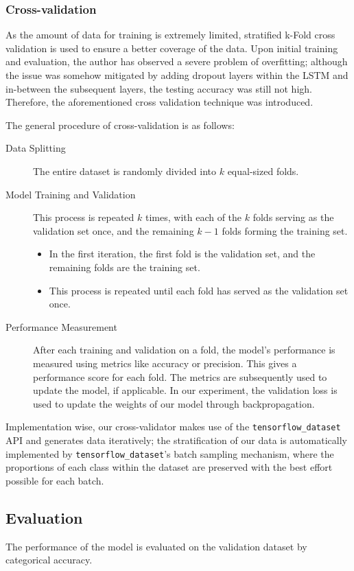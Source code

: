 \documentclass[letterpaper]{article} %
\begin{document}
\subsubsection{Cross-validation}
As the amount of data for training is extremely limited,
stratified k-Fold cross validation is used to ensure a better
coverage of the data. 
Upon initial training and evaluation, the author has observed 
a severe problem of overfitting; although the issue was somehow
mitigated by adding dropout layers within the LSTM and in-between
the subsequent layers, the testing accuracy was still not high.
Therefore, the aforementioned cross validation technique was introduced.

The general procedure of cross-validation is as follows:
\begin{description}
  \item[Data Splitting] 
  The entire dataset is randomly divided into $k$ equal-sized folds. 
  \item[Model Training and Validation] 
  This process is repeated $k$ times, with each of the $k$ folds 
  serving as the validation set once, 
  and the remaining $k - 1$ folds forming the training set.
  \begin{itemize}
      \item In the first iteration, the first fold is the validation set, 
        and the remaining folds are the training set.
      \item This process is repeated until each fold has served as the validation set once.
  \end{itemize}
  \item[Performance Measurement] 
  After each training and validation on a fold, 
  the model's performance is measured using metrics like accuracy or precision. 
  This gives a performance score for each fold.
  The metrics are subsequently used to update the model,
  if applicable. In our experiment, the validation loss is used
  to update the weights of our model through backpropagation.
\end{description}

Implementation wise, our cross-validator makes use of 
the \lstinline|tensorflow_dataset| API
and generates data iteratively;
the stratification of our data is automatically 
implemented by \lstinline|tensorflow_dataset|'s 
batch sampling mechanism,
where the proportions of each class within the dataset are 
preserved with the best effort possible for each batch.

\subsection{Evaluation}
The performance of the model
is evaluated on the validation dataset
by categorical accuracy.
\end{document}
